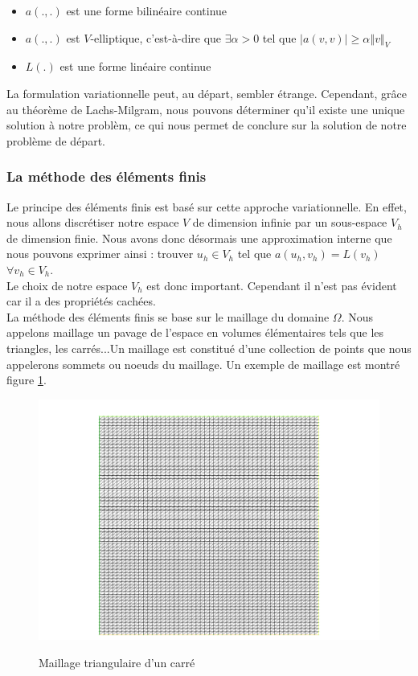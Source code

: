 \begin{itemize}
	\item $a(.,.)$ est une forme bilinéaire continue
	\item $a(.,.)$ est $V$-elliptique, c'est-à-dire que $\exists\alpha>0$ tel que $\left| a(v,v)\right| \ge \alpha\left\Vert v\right\Vert_{V}$
	\item $L(.)$ est une forme linéaire continue
\end{itemize}
La formulation variationnelle peut, au départ, sembler étrange. Cependant, grâce au théorème de Lachs-Milgram, nous pouvons déterminer qu'il existe une unique solution à notre problèm, ce qui nous permet de conclure sur la solution de notre problème de départ.\\

\subsubsection{La méthode des éléments finis}
Le principe des éléments finis est basé sur cette approche variationnelle. En effet, nous allons discrétiser notre espace $V$ de dimension infinie par un sous-espace $V_{h}$ de dimension finie. Nous avons donc désormais une approximation interne que nous pouvons exprimer ainsi : trouver $u_{h}\in V_{h}$ tel que $a(u_{h}, v_{h})=L\left(v_{h}\right)$ $\forall v_{h}\in V_h$. \\
Le choix de notre espace $V_{h}$ est donc important. Cependant il n'est pas évident car il a des propriétés cachées.\\

La méthode des éléments finis se base sur le maillage du domaine $\Omega$. Nous appelons maillage un pavage de l'espace en volumes élémentaires tels que les triangles, les carrés...Un maillage est constitué d'une collection de points que nous appelerons sommets ou noeuds du maillage. Un exemple de maillage est montré figure \ref{mail1}.
\begin{figure}[!h]
\hspace{-9em} \includegraphics[scale=0.85]{maillage-eps-converted-to.pdf}\\
\caption{Maillage triangulaire d'un carré}
\label{mail1}
\end{figure}

